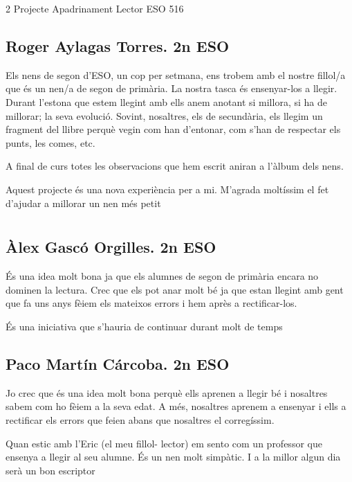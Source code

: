 \begin{news}
{2} %
{Projecte Apadrinament Lector}
{}
{ESO}
{516} %

\subsection*{
Roger Aylagas Torres. 2n ESO}

 Els nens de segon d'ESO, un cop per setmana, ens trobem amb el nostre fillol/a que és un nen/a de segon de primària. La nostra tasca és ensenyar-los a llegir. Durant l'estona que estem llegint amb ells anem anotant  si millora, si ha de millorar; la seva evolució. Sovint, nosaltres, els de secundària, els llegim un fragment del llibre perquè vegin com han d'entonar, com s'han de respectar els punts, les comes, etc. 

A final de curs totes les observacions que hem escrit aniran a l'àlbum dels nens.

{ Aquest projecte és una nova experiència per a mi. M'agrada moltíssim el fet d'ajudar a millorar un nen més petit}


\section*{}

\subsection*{
Àlex Gascó Orgilles. 2n ESO}

 És una idea molt bona ja que els alumnes de segon de primària encara no dominen la lectura. Crec que els pot anar molt bé ja que estan llegint amb gent que fa uns anys fèiem els mateixos errors i hem après a rectificar-los.

{És una iniciativa que s'hauria de continuar durant molt de temps}


\subsection*
{Paco Martín Cárcoba. 2n ESO }

 Jo crec que és una idea molt bona perquè ells aprenen a llegir bé i nosaltres sabem com ho fèiem a la seva edat. A més, nosaltres aprenem a ensenyar i ells a rectificar els errors que feien abans que nosaltres el corregíssim.

{Quan estic amb l'Eric (el meu fillol- lector) em sento com un professor que ensenya a llegir al seu alumne. És un nen molt simpàtic. I a la millor algun dia serà un bon escriptor}

\end{news}
